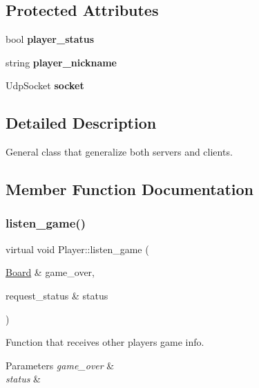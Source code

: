 \subsection*{Protected Attributes}
\begin{DoxyCompactItemize}
\item 
\mbox{\label{classPlayer_ac42f58fe593fbb98c0091dc924c61c12}} 
bool {\bfseries player\+\_\+status}
\item 
\mbox{\label{classPlayer_a53497b6290559a3efae0afdd5e4da5a1}} 
string {\bfseries player\+\_\+nickname}
\item 
\mbox{\label{classPlayer_a205c6f31ac48b32e32b1e3951ba28a08}} 
Udp\+Socket {\bfseries socket}
\end{DoxyCompactItemize}


\subsection{Detailed Description}
General class that generalize both servers and clients. 

\subsection{Member Function Documentation}
\mbox{\label{classPlayer_a24a94f532e7ea75b3429795e34902a94}} 
\subsubsection{\texorpdfstring{listen\+\_\+game()}{listen\_game()}}
{\footnotesize\ttfamily virtual void Player\+::listen\+\_\+game (\begin{DoxyParamCaption}\item[{\hyperlink{classBoard}{Board} \&}]{game\+\_\+over,  }\item[{request\+\_\+status \&}]{status }\end{DoxyParamCaption})\hspace{0.3cm}{\ttfamily [pure virtual]}}



Function that receives other players\textquotesingle{} game info. 


\begin{DoxyParams}{Parameters}
{\em game\+\_\+over} & \\
\hline
{\em status} & \\
\hline
\end{DoxyParams}


